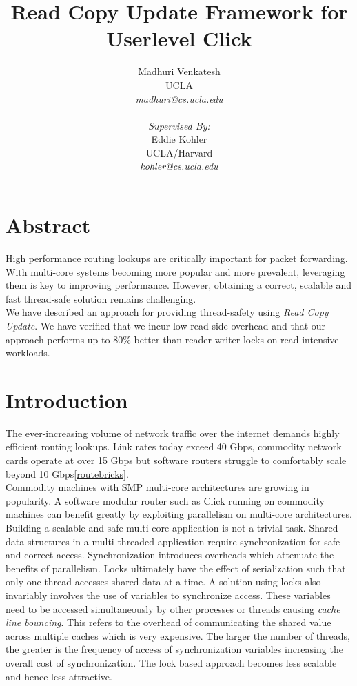 \documentclass[a4paper,marginparwidth=50pt,marginparsep=10pt]{article}
\begin{document}
\author { 
Madhuri Venkatesh 
\\ UCLA 
\\ \textsl{madhuri@cs.ucla.edu}
\\
\\
\textsl{Supervised By:}
\\Eddie Kohler 
\\ UCLA/Harvard
\\ \textsl{kohler@cs.ucla.edu}
}
\title{Read Copy Update Framework for Userlevel Click}
\maketitle

\pagebreak
\section{Abstract}
High performance routing lookups are critically important for packet forwarding. With multi-core systems becoming more popular and more prevalent, leveraging them is key to improving performance. However, obtaining a correct, scalable and fast thread-safe solution remains challenging.\\

We have described an approach for providing thread-safety using \emph{Read Copy Update}. We have verified that we incur low read side overhead and that our approach performs up to 80\% better than reader-writer locks on read intensive workloads.
\section{Introduction}
The ever-increasing volume of network traffic over the internet demands highly efficient routing lookups. Link rates today exceed 40 Gbps, commodity network cards operate at over 15 Gbps but software routers struggle to comfortably scale beyond 10 Gbps\ref{routebricks}.\\

Commodity machines with SMP multi-core architectures are growing in popularity. A software modular router such as Click\cite{click} running on commodity machines  can benefit greatly by exploiting parallelism on multi-core architectures.\\

Building a scalable and safe multi-core application is not a trivial task. Shared data structures in a multi-threaded application require synchronization for safe and correct access. Synchronization introduces overheads which attenuate the benefits of parallelism. Locks ultimately have the effect of  serialization such that only one thread accesses shared data at a time. A solution using locks also invariably involves the use of variables to synchronize access. These variables need to be accessed simultaneously by other processes or threads causing \emph{cache line bouncing}. This refers to the overhead of communicating the shared value across multiple caches which is very expensive. The larger the number of threads, the greater is the frequency of access of synchronization variables increasing the overall cost of synchronization. The lock based approach becomes less scalable and hence less attractive.\\
\end{document}

